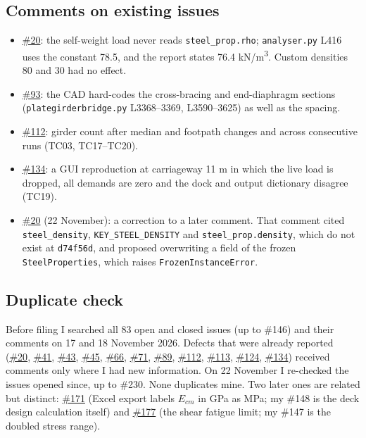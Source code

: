 \documentclass[11pt,a4paper]{article}
\newcommand{\issue}[1]{\href{https://github.com/Nidhikhare12/OsdagBridge/issues/#1}{\##1}}
\newcommand{\src}[1]{\texttt{#1}}
\begin{document}
\subsection{Comments on existing issues}
\begin{itemize}
\item \issue{20}: the self-weight load never reads \texttt{steel\_prop.rho}; \src{analyser.py} L416 uses the constant 78.5, and the
  report states 76.4 kN/m\textsuperscript{3}. Custom densities 80 and 30 had no effect.
\item \issue{93}: the CAD hard-codes the cross-bracing and end-diaphragm sections (\src{plategirderbridge.py} L3368--3369,
  L3590--3625) as well as the spacing.
\item \issue{112}: girder count after median and footpath changes and across consecutive runs (TC03, TC17--TC20).
\item \issue{134}: a GUI reproduction at carriageway 11 m in which the live load is dropped, all demands are zero and the dock and
  output dictionary disagree (TC19).
\item \issue{20} (22 November): a correction to a later comment. That comment cited \texttt{steel\_density},
  \texttt{KEY\_STEEL\_DENSITY} and \texttt{steel\_prop.density}, which do not exist at \texttt{d74f56d}, and proposed
  overwriting a field of the frozen \texttt{SteelProperties}, which raises \texttt{FrozenInstanceError}.
\end{itemize}

\subsection{Duplicate check}
Before filing I searched all 83 open and closed issues (up to \#146) and their comments on 17 and 18 November 2026. Defects that
were already reported (\issue{20}, \issue{41}, \issue{43}, \issue{45}, \issue{66}, \issue{71}, \issue{89}, \issue{112},
\issue{113}, \issue{124}, \issue{134}) received comments only where I had new information. On 22 November I re-checked the
issues opened since, up to \#230. None duplicates mine. Two later ones are related but distinct: \issue{171} (Excel export
labels $E_{cm}$ in GPa as MPa; my \#148 is the deck design calculation itself) and \issue{177} (the shear fatigue limit; my
\#147 is the doubled stress range).
\end{document}
